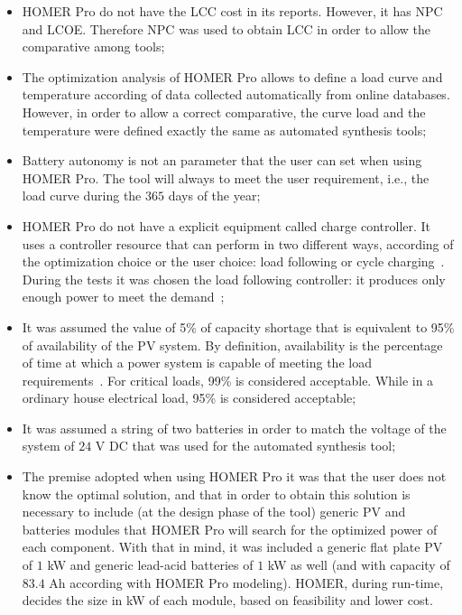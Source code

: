 \begin{itemize}
	\item HOMER Pro do not have the LCC cost in its reports. However, it has NPC and LCOE. Therefore NPC was used to obtain LCC in order to allow the comparative among tools;
	\item The optimization analysis of HOMER Pro allows to define a load curve and temperature according of data collected automatically from online databases. However, in order to allow a correct comparative, the curve load and the temperature were defined exactly the same as automated synthesis tools;
	\item Battery autonomy is not an parameter that the user can set when using HOMER Pro. The tool will always to meet the user requirement, i.e., the load curve during the $365$ days of the year;
	\item HOMER Pro do not have a explicit equipment called charge controller. It uses a controller resource that can perform in two different ways, according of the optimization choice or the user choice: load following or cycle charging~\cite{HOMER}. During the tests it was chosen the load following controller: it produces only enough power to meet the demand~\cite{HOMER};
	\item It was assumed the value of 5\% of capacity shortage that is equivalent to 95\% of availability of the PV system. By definition, availability is the percentage of time at which a power system is capable of meeting the load requirements~\cite{Khatib2014}. For critical loads, 99\% is considered acceptable. While in a ordinary house electrical load, 95\% is considered acceptable;
	\item It was assumed a string of two batteries in order to match the voltage of the system of $24$ V DC that was used for the automated synthesis tool;
	\item The premise adopted when using HOMER Pro it was that the user does not know the optimal solution, and that in order to obtain this solution is necessary to include (at the design phase of the tool) generic PV and batteries modules that HOMER Pro will search for the optimized power of each component. With that in mind, it was included a generic flat plate PV of $1$ kW and generic lead-acid batteries of $1$ kW as well (and with capacity of $83.4$ Ah according with HOMER Pro modeling). HOMER, during run-time, decides the size in kW of each module, based on feasibility and lower cost.
\end{itemize}

